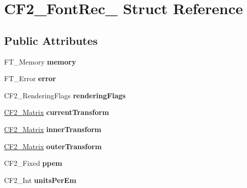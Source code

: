 \hypertarget{struct_c_f2___font_rec__}{}\section{C\+F2\+\_\+\+Font\+Rec\+\_\+ Struct Reference}
\label{struct_c_f2___font_rec__}
\subsection*{Public Attributes}
\begin{DoxyCompactItemize}
\item 
\mbox{\label{struct_c_f2___font_rec___a6ba5b92d6806189d0ac686951262abc2}} 
F\+T\+\_\+\+Memory {\bfseries memory}
\item 
\mbox{\label{struct_c_f2___font_rec___a78b08b3820b2f58bbd29dff52427b49d}} 
F\+T\+\_\+\+Error {\bfseries error}
\item 
\mbox{\label{struct_c_f2___font_rec___a5778703f256370f3b40aa2c582f8776f}} 
C\+F2\+\_\+\+Rendering\+Flags {\bfseries rendering\+Flags}
\item 
\mbox{\label{struct_c_f2___font_rec___ab0cf609e831a59973be1214c9ab463aa}} 
\hyperlink{struct_c_f2___matrix__}{C\+F2\+\_\+\+Matrix} {\bfseries current\+Transform}
\item 
\mbox{\label{struct_c_f2___font_rec___adb7ecff5226943a37a97e8595c583611}} 
\hyperlink{struct_c_f2___matrix__}{C\+F2\+\_\+\+Matrix} {\bfseries inner\+Transform}
\item 
\mbox{\label{struct_c_f2___font_rec___aafcf26a7817c5b87ec1bc9020c4cce60}} 
\hyperlink{struct_c_f2___matrix__}{C\+F2\+\_\+\+Matrix} {\bfseries outer\+Transform}
\item 
\mbox{\label{struct_c_f2___font_rec___a5e96a2c3531d538aab2d44af6e0eb17b}} 
C\+F2\+\_\+\+Fixed {\bfseries ppem}
\item 
\mbox{\label{struct_c_f2___font_rec___ae5f8ad20f6ad0dff6c123424c6601fc5}} 
C\+F2\+\_\+\+Int {\bfseries units\+Per\+Em}

\end{DoxyCompactItemize}
